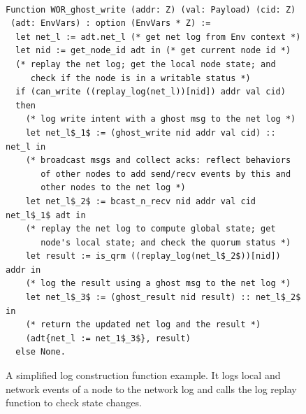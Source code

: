 \begin{figure} 
%


\begin{lstlisting}[language=mycoq, basicstyle=\small]%, basicstyle=\linespread{0.5}]

Function WOR_ghost_write (addr: Z) (val: Payload) (cid: Z)
 (adt: EnvVars) : option (EnvVars * Z) :=
  let net_l := adt.net_l (* get net log from Env context *)
  let nid := get_node_id adt in (* get current node id *)
  (* replay the net log; get the local node state; and
     check if the node is in a writable status *)
  if (can_write ((replay_log(net_l))[nid]) addr val cid)
  then
    (* log write intent with a ghost msg to the net log *)
    let net_l$_1$ := (ghost_write nid addr val cid) :: net_l in
    (* broadcast msgs and collect acks: reflect behaviors 
       of other nodes to add send/recv events by this and
       other nodes to the net log *)
    let net_l$_2$ := bcast_n_recv nid addr val cid net_l$_1$ adt in
    (* replay the net log to compute global state; get 
       node's local state; and check the quorum status *)
    let result := is_qrm ((replay_log(net_l$_2$))[nid]) addr in
    (* log the result using a ghost msg to the net log *)
    let net_l$_3$ := (ghost_result nid result) :: net_l$_2$ in
    (* return the updated net log and the result *)
    (adt{net_l := net_1$_3$}, result)
  else None.
\end{lstlisting}

\caption{A simplified log construction function example. It logs local and network events of a node to the network log and calls the log replay function to check state changes.}
\label{fig:spec}
\end{figure}

